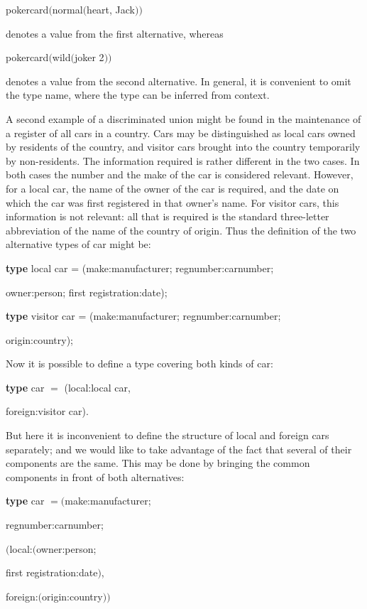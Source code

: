 \documentclass[twoside,11pt]{book}
\begin{document}
\quad pokercard$($normal$($heart, Jack$))$

\noindent
denotes a value from the first alternative, whereas

\quad pokercard$($wild$($joker 2$))$

\noindent
denotes a value from the second alternative. In general, it is convenient to omit the type name, where the type can be inferred from context.

A second example of a discriminated union might be found in the maintenance of a register of all cars in a country. Cars may be distinguished as local cars owned by residents of the country, and visitor cars brought into the country temporarily by non-residents. The information required is rather different in the two cases. In both cases the number and the make of the car is considered relevant. However, for a local car, the name of the owner of the car is required, and the date on which the car was first registered in that owner's name. For visitor cars, this information is not relevant: all that is required is the standard three-letter abbreviation of the name of the country of origin. Thus the definition of the two alternative types of car might be:

\quad \textbf{type} local car = (make:manufacturer; regnumber:carnumber;

\tabto{9.4em} owner:person; first registration:date);

\quad \textbf{type} visitor car = (make:manufacturer; regnumber:carnumber;

\tabto{10.1em} origin:country);

Now it is possible to define a type covering both kinds of car:

\quad \textbf{type} car $=$ (local:local car,

\tabto{7.4em} foreign:visitor car).

\noindent
But here it is inconvenient to define the structure of local and foreign cars separately; and we would like to take advantage of the fact that several of their components are the same. This may be done by bringing the common components in front of both alternatives:

\quad \textbf{type} car $= ($make:manufacturer;

\tabto{7.5em}regnumber:carnumber;

\tabto{7.5em}$($local:$($owner:person;

\tabto{7.8em}first registration:date$)$,

\tabto{7.8em}foreign:$($origin:country$))$
\end{document}
